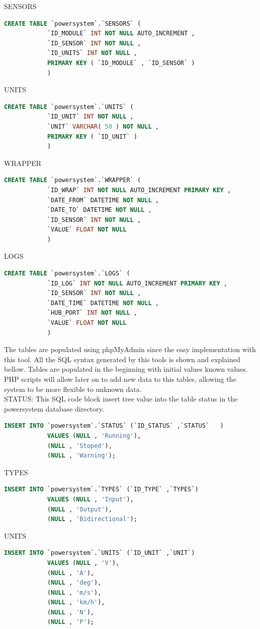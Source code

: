 		SENSORS
		\begin{lstlisting}[language=sql, stepnumber=0, tabsize=1]
			CREATE TABLE `powersystem`.`SENSORS` (
			`ID_MODULE` INT NOT NULL AUTO_INCREMENT ,
			`ID_SENSOR` INT NOT NULL ,
			`ID_UNITS` INT NOT NULL ,
			PRIMARY KEY ( `ID_MODULE` , `ID_SENSOR` )
			)
		\end{lstlisting}
		UNITS
		\begin{lstlisting}[language=sql, stepnumber=0, tabsize=1]
			CREATE TABLE `powersystem`.`UNITS` (
			`ID_UNIT` INT NOT NULL ,
			`UNIT` VARCHAR( 50 ) NOT NULL ,
			PRIMARY KEY ( `ID_UNIT` )
			)
		\end{lstlisting}
		WRAPPER
		\begin{lstlisting}[language=sql, stepnumber=0, tabsize=1]
			CREATE TABLE `powersystem`.`WRAPPER` (
			`ID_WRAP` INT NOT NULL AUTO_INCREMENT PRIMARY KEY ,
			`DATE_FROM` DATETIME NOT NULL ,
			`DATE_TO` DATETIME NOT NULL ,
			`ID_SENSOR` INT NOT NULL ,
			`VALUE` FLOAT NOT NULL
			)
		\end{lstlisting}
		LOGS
		\begin{lstlisting}[language=sql, stepnumber=0, tabsize=1]
			CREATE TABLE `powersystem`.`LOGS` (
			`ID_LOG` INT NOT NULL AUTO_INCREMENT PRIMARY KEY ,
			`ID_SENSOR` INT NOT NULL ,
			`DATE_TIME` DATETIME NOT NULL ,
			`HUB_PORT` INT NOT NULL ,
			`VALUE` FLOAT NOT NULL
			)
		\end{lstlisting}
	
The tables are populated using phpMyAdmin since the easy implementation with this tool. All the SQL syntax generated by this tools is shown and explained bellow.
Tables are populated in the beginning with initial values known values. PHP scripts will allow later on to add new data to this tables, allowing the system to be more flexible to unknown data.\\
		STATUS:
		This SQL code block insert tree value into the table status in the powersystem database directory.
		\begin{lstlisting}[language=sql, stepnumber=0, tabsize=1]
			INSERT INTO `powersystem`.`STATUS` (`ID_STATUS` ,`STATUS`	)
			VALUES (NULL , 'Running'),
			(NULL , 'Stoped'),
			(NULL , 'Warning');
		\end{lstlisting}
		TYPES
		\begin{lstlisting}[language=sql, stepnumber=0, tabsize=1]
			INSERT INTO `powersystem`.`TYPES` (`ID_TYPE` ,`TYPES`)
			VALUES (NULL , 'Input'), 
			(NULL , 'Output'),
			(NULL , 'Bidirectional');
		\end{lstlisting}
		UNITS
		\begin{lstlisting}[language=sql, stepnumber=0, tabsize=1]
			INSERT INTO `powersystem`.`UNITS` (`ID_UNIT` ,`UNIT`)
			VALUES (NULL , 'V'),
			(NULL , 'A'),
			(NULL , 'deg'), 
			(NULL , 'm/s'), 
			(NULL , 'km/h'), 
			(NULL , 'N'), 
			(NULL , 'P');
		\end{lstlisting}		

